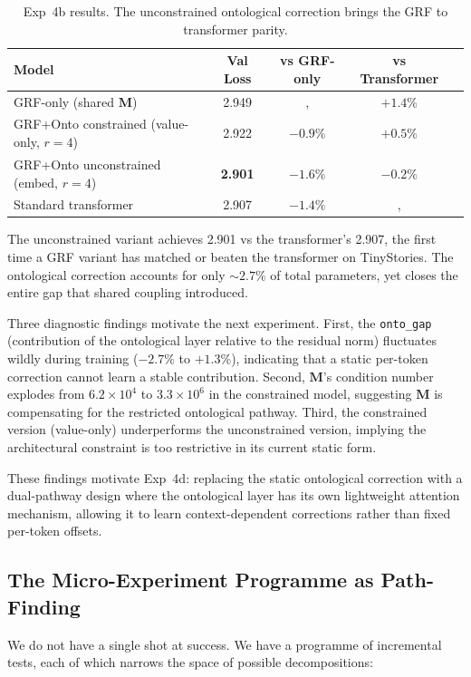 \documentclass[11pt, a4paper]{article}
\newcommand{\M}{\mathbf{M}}
\theoremstyle{remark}
\begin{document}
\begin{table}[h]
\centering
\begin{tabular}{@{}lcccc@{}}
\toprule
Model & Val Loss & vs GRF-only & vs Transformer \\
\midrule
GRF-only (shared $\M$) & 2.949 & ,  & $+1.4\%$ \\
GRF+Onto constrained (value-only, $r{=}4$) & 2.922 & $-0.9\%$ & $+0.5\%$ \\
GRF+Onto unconstrained (embed, $r{=}4$) & \textbf{2.901} & $-1.6\%$ & $-0.2\%$ \\
Standard transformer & 2.907 & $-1.4\%$ & ,  \\
\bottomrule
\end{tabular}
\caption{Exp~4b results. The unconstrained ontological correction brings the GRF to transformer parity.}
\label{tab:exp4b}
\end{table}

The unconstrained variant achieves 2.901 vs the transformer's 2.907, the first time a GRF variant has matched or beaten the transformer on TinyStories.
The ontological correction accounts for only ${\sim}2.7\%$ of total parameters, yet closes the entire gap that shared coupling introduced.

Three diagnostic findings motivate the next experiment.
First, the \texttt{onto\_gap} (contribution of the ontological layer relative to the residual norm) fluctuates wildly during training ($-2.7\%$ to $+1.3\%$), indicating that a static per-token correction cannot learn a stable contribution.
Second, $\M$'s condition number explodes from $6.2{\times}10^4$ to $3.3{\times}10^6$ in the constrained model, suggesting $\M$ is compensating for the restricted ontological pathway.
Third, the constrained version (value-only) underperforms the unconstrained version, implying the architectural constraint is too restrictive in its current static form.

These findings motivate Exp~4d: replacing the static ontological correction with a dual-pathway design where the ontological layer has its own lightweight attention mechanism, allowing it to learn context-dependent corrections rather than fixed per-token offsets.

\subsection{The Micro-Experiment Programme as Path-Finding}

We do not have a single shot at success.
We have a programme of incremental tests, each of which narrows the space of possible decompositions:
\end{document}
